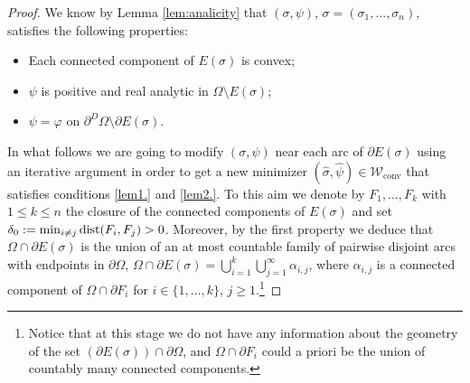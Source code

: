 \documentclass[JEP,XML,SOM,Unicode, NoFloatCountersInSection,published]{cedram}
\let\Om\Omega
\newcommand\admclassconv{{\mathcal W_\mathrm{conv}}}
\newcommand{\dist}{\textup{dist}}
\theoremstyle{definition}
\begin{document}
\begin{proof}

We know by Lemma \ref{lem:analicity} that $(\sigma,\psi)$, $\sigma=(\sigma_1,\dots,\sigma_n)$, satisfies the following properties:
\begin{itemize}
\item
Each connected component of $E(\sigma)$ is convex;
\item $\psi$ is positive and real analytic
in $\Om\setminus E(\sigma)$;
\item $\psi=\varphi$ on $\partial^D\Om\setminus\partial E(\sigma)$.
\end{itemize}

In what follows we are going to modify $(\sigma,\psi)$ near each arc of $\partial E(\sigma)$ using an iterative argument in order to get a new minimizer $(\widehat\sigma,\widehat\psi)\in\admclassconv$ that satisfies conditions \ref{lem1.} and \ref{lem2.}. To this aim we denote by $F_1,\dots,F_k$ with $1\le k\le n$ the closure of the connected components of $E(\sigma)$ and set
$ \delta_0:=\min_{i\ne j}\dist(F_i,F_j)>0$. Moreover, by the first property we deduce that $\Om\cap\partial E(\sigma)$ is the union of an at most countable family of pairwise disjoint arcs with endpoints in $\partial\Om$, \ie $\Om\cap \partial E(\sigma)=
\bigcup_{i=1}^k\bigcup_{j=1}^\infty \alpha_{i,j}$, where $\alpha_{i,j}$ is a connected component of $\Om\cap\partial F_i$ for $i\in\{1,
\dots,k\}$, $j\ge1$.\footnote{Notice that at this stage we do not have any information about the geometry of the set $(\partial E(\sigma))\cap \partial\Om$, and $\Om\cap\partial F_i$ could a priori be the union of countably many connected components.}


\end{proof}
\end{document}
